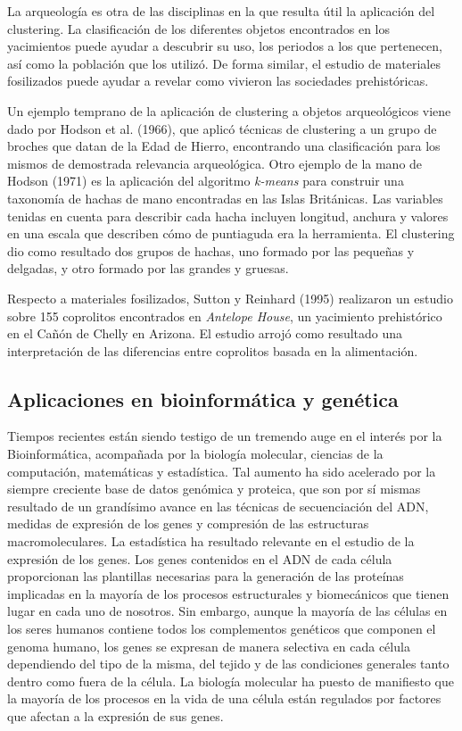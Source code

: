 La arqueología es otra de las disciplinas en la que resulta útil la aplicación del clustering. La clasificación de los diferentes objetos encontrados en los yacimientos puede ayudar a descubrir su uso, los periodos a los que pertenecen, así como la población que los utilizó. De forma similar, el estudio de materiales fosilizados puede ayudar a revelar como vivieron las sociedades prehistóricas. 

Un ejemplo temprano de la aplicación de clustering a objetos arqueológicos viene dado por Hodson et al. (1966), que aplicó técnicas de clustering a un grupo de broches que datan de la Edad de Hierro, encontrando una clasificación para los mismos de demostrada relevancia arqueológica. Otro ejemplo de la mano de Hodson (1971) es la aplicación del algoritmo \textit{k-means} para construir una taxonomía de hachas de mano encontradas en las Islas Británicas. Las variables tenidas en cuenta para describir cada hacha incluyen longitud, anchura y valores en una escala que describen cómo de puntiaguda era la herramienta. El clustering dio como resultado dos grupos de hachas, uno formado por las pequeñas y delgadas, y otro formado por las grandes y gruesas.

Respecto a materiales fosilizados, Sutton y Reinhard (1995) realizaron un estudio sobre 155 coprolitos encontrados en \textit{Antelope House}, un yacimiento prehistórico en el Cañón de Chelly en Arizona. El estudio arrojó como resultado una interpretación de las diferencias entre coprolitos basada en la alimentación.

\subsection{Aplicaciones en bioinformática y genética}

Tiempos recientes están siendo testigo de un tremendo auge en el interés por la Bioinformática, acompañada por la biología molecular, ciencias de la computación, matemáticas y estadística. Tal aumento ha sido acelerado por la siempre creciente base de datos genómica y proteica, que son por sí mismas resultado de un grandísimo avance en las técnicas de secuenciación del ADN, medidas de expresión de los genes y compresión de las estructuras macromoleculares. La estadística ha resultado relevante en el estudio de la expresión de los genes. Los genes contenidos en el ADN de cada célula proporcionan las plantillas necesarias para la generación de las proteínas implicadas en la mayoría de los procesos estructurales y biomecánicos que tienen lugar en cada uno de nosotros. Sin embargo, aunque la mayoría de las células en los seres humanos contiene todos los complementos genéticos que componen el genoma humano, los genes se expresan de manera selectiva en cada célula dependiendo del tipo de la misma, del tejido y de las condiciones generales tanto dentro como fuera de la célula. La biología molecular ha puesto de manifiesto que la mayoría de los procesos en la vida de una célula están regulados por factores que afectan a la expresión de sus genes.


